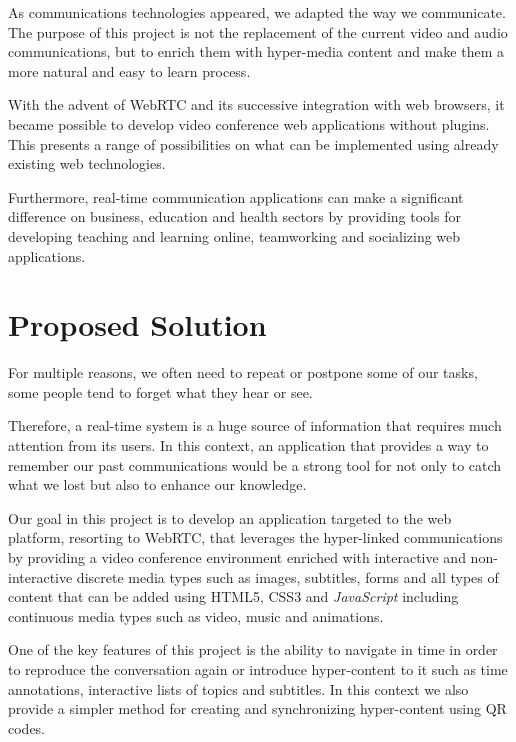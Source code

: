	As communications technologies appeared, we adapted the way we communicate. The purpose of this project is not the replacement of the current video and audio communications, but to enrich them with hyper-media content and make them a more natural and easy to learn process. 

	With the advent of WebRTC and its successive integration with web browsers, it became possible to develop video conference web applications without plugins. This presents a range of possibilities on what can be implemented using already existing web technologies.
		
    Furthermore, real-time communication applications can make a significant difference on business, education and health sectors by providing tools for developing teaching and learning online, teamworking and socializing web applications.



\section{Proposed Solution}
\label{section:proposed}

	For multiple reasons, we often need to repeat or postpone some of our tasks, some people tend to forget what they hear or see.     
        
	Therefore, a real-time system is a huge source of information that requires much attention from its users. In this context, an application that provides a way to remember our past communications would be a strong tool for not only to catch what we lost but also to enhance our knowledge.

	Our goal in this project is to develop an application targeted to the web platform, resorting to \ac{WebRTC}, that leverages the hyper-linked communications by providing a video conference environment enriched with interactive and non-interactive discrete media types such as images, subtitles, forms and all types of content that can be added using \ac{HTML}5, \ac{CSS}3 and \emph{JavaScript} including continuous media types such as video, music and animations.

	One of the key features of this project is the ability to navigate in time in order to reproduce the conversation again or introduce hyper-content to it such as time annotations, interactive lists of topics and subtitles. In this context we also provide a simpler method for creating and synchronizing hyper-content using \ac{QR} codes.

